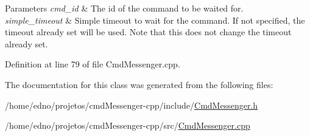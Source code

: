 \begin{DoxyParams}{Parameters}
{\em cmd\+\_\+id} & The id of the command to be waited for. \\
\hline
{\em simple\+\_\+timeout} & Simple timeout to wait for the command. If not specified, the timeout already set will be used. Note that this does not change the timeout already set. \\
\hline
\end{DoxyParams}


Definition at line 79 of file Cmd\+Messenger.\+cpp.



The documentation for this class was generated from the following files\+:\begin{DoxyCompactItemize}
\item 
/home/edno/projetos/cmd\+Messenger-\/cpp/include/\hyperlink{_cmd_messenger_8h}{Cmd\+Messenger.\+h}\item 
/home/edno/projetos/cmd\+Messenger-\/cpp/src/\hyperlink{_cmd_messenger_8cpp}{Cmd\+Messenger.\+cpp}\end{DoxyCompactItemize}
